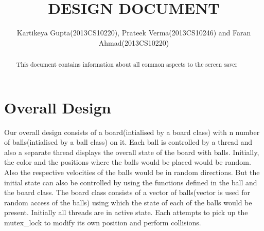 \setlength{\topmargin}{-.5in}
\setlength{\textheight}{9in}
\setlength{\oddsidemargin}{.125in}
\setlength{\textwidth}{6.25in}

\usepackage{listings}
\usepackage{color} 


\title
{DESIGN DOCUMENT}
\author
{Kartikeya Gupta(2013CS10220), Prateek Verma(2013CS10246) and Faran Ahmad(2013CS10220)}
\renewcommand{\today}{January 10, 2015}
\maketitle 
\begin{abstract}
This document contains information about all common aspects to the screen saver
\end{abstract}
\pagebreak 
\section{Overall Design}
Our overall design consists of a board(intialised by a board class) with n number of balls(intialised by a ball class) on it. Each ball is controlled by a thread and also a separate thread displays the overall state of the board with balls. Initially, the color and the positions where the balls would be placed would be random. Also the respective velocities of the balls would be in random directions. But the initial state can also be controlled by using the functions defined in the ball and the board class. The board class consists of a vector of balls(vector is used for random access of the balls) using which the state of each of the balls would be present. Initially all threads are in active state. Each attempts to pick up the mutex_lock to modify its own position and perform collisions. 

